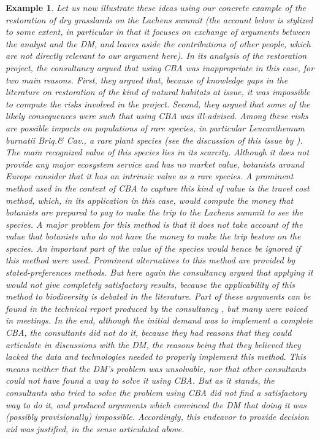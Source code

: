 \documentclass[preprint, french, english, 11pt, authoryear]{elsarticle}%
\newtheorem{example}{Example}
\begin{document}
\begin{example}
Let us now illustrate these ideas using our concrete example of the restoration of dry grasslands on the Lachens summit 
(the account below is stylized to some extent, in particular in that it focuses on exchange of arguments between the analyst and the \ac{DM}, and leaves aside the contributions of other people, which are not directly relevant to our argument here). 
In its analysis of the restoration project, the consultancy argued that using \ac{CBA} was inappropriate in this case, for two main reasons. 
First, they argued that, because of knowledge gaps in the literature on restoration of the kind of natural habitats at issue, it was impossible to compute the risks involved in the project. 
Second, they argued that some of the likely consequences were such that using \ac{CBA} was ill-advised.
 Among these risks are possible impacts on populations of rare species, in particular \emph{Leucanthemum burnatii} Briq.\@ \& Cav.\@, a rare plant species (see the discussion of this issue by \citet{meinard_ethical_2016}).
The main recognized value of this species lies in its scarcity. Although it does not provide any major ecosystem service and has no market value, botanists around Europe consider that it has an intrinsic value as a rare species.
A prominent method used in the context of \ac{CBA} to capture this kind of value is the travel cost method, which, in its application in this case, would compute the money that botanists are prepared to pay to make the trip to the Lachens summit to see the species.
A major problem for this method is that it does not take account of the value that botanists who do not have the money to make the trip bestow on the species. An important part of the value of the species would hence be ignored if this method were used.
Prominent alternatives to this method are provided by stated-preferences methods. But here again the consultancy argued that applying it would not give completely satisfactory results, because the applicability of this method to biodiversity is debated in the literature.
Part of these arguments can be found in the technical report produced by the consultancy \citep{meinard_etude_2015}, but many were voiced in meetings.
In the end, although the initial demand was to implement a complete \ac{CBA}, the consultants did not do it, because they had reasons that they could articulate in discussions with the \ac{DM}, the reasons being that they believed they lacked the data and technologies needed to properly implement this method. 
This means neither that the \ac{DM}’s problem was unsolvable, nor that other consultants could not have found a way to solve it using \ac{CBA}.
But as it stands, the consultants who tried to solve the problem using \ac{CBA} did not find a satisfactory way to do it, and produced arguments which convinced the \ac{DM} that doing it was (possibly provisionally) impossible.
Accordingly, this endeavor to provide decision aid was justified, in the sense articulated above.
\end{example}
\end{document}
